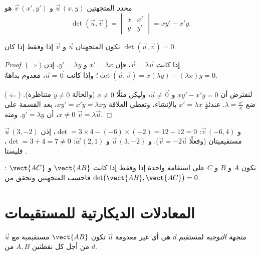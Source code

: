 \begin{definition}[المحدد]\label{def:g11:vect:det}
\emph{محدد} المتجهتين $\vec u\,(x, y)$ و
$\vec v\,(x', y')$ هو
\[
\det(\vec u, \vec v) =
\begin{vmatrix} x & x' \\ y & y' \end{vmatrix}
= x y' - x' y .
\]
\end{definition}

\begin{theorem}\label{thm:g11:vect:collinearity}
تكون المتجهتان $\vec u$ و $\vec v$  إذا وفقط إذا كان
$\det(\vec u, \vec v) = 0$.
\end{theorem}

\begin{proof}
($\Rightarrow$) إذا كانت $\vec v = \lambda\vec u$، فإن $x' = \lambda x$ و
$y' = \lambda y$، إذن
$\det(\vec u, \vec v) = x(\lambda y) - (\lambda x)y = 0$؛ وإذا كانت
$\vec u = \vec 0$،  معدوم بداهةً.

($\Leftarrow$) لنفترض أن $xy' - x'y = 0$ و $\vec u \neq \vec 0$، وليكن مثلًا
$x \neq 0$ (والحالة $y \neq 0$ متناظرة). ضع
$\lambda = \frac{x'}{x}$. عندئذٍ $x' = \lambda x$ بالإنشاء، وتعطي
العلاقة $xy' = x'y = \lambda x y$، بعد القسمة على $x \neq 0$،
أن $y' = \lambda y$. ومنه $\vec v = \lambda \vec u$.
\end{proof}

\begin{example}\label{ex:g11:vect:collinear}
$\vec u\,(3, -2)$ و $\vec v\,(-6, 4)$:
$\det = 3 \times 4 - (-6) \times (-2) = 12 - 12 = 0$، إذن مستقيميتان (وفعلًا
$\vec v = -2\vec u$). و $\vec u\,(3, -2)$ و $\vec w\,(2, 1)$:
$\det = 3 + 4 = 7 \neq 0$، فليستا .
\end{example}

\begin{method}\label{met:g11:vect:alignment}
تكون $A$ و $B$ و $C$ على استقامة واحدة إذا وفقط إذا كانت $\vect{AB}$ و $\vect{AC}$
: فاحسب المتجهتين وتحقق من
$\det\bigl(\vect{AB}, \vect{AC}\bigr) = 0$.
\end{method}

\section{المعادلات الديكارتية للمستقيمات}

\begin{definition}\label{def:g11:vect:direction}
\emph{متجهة التوجيه} لمستقيم $d$ هي أي
 غير معدومة $\vec u$ تكون $\vect{AB}$ مستقيمية مع $\vec u$
من أجل كل نقطتين $A, B$ من $d$.
\end{definition}

